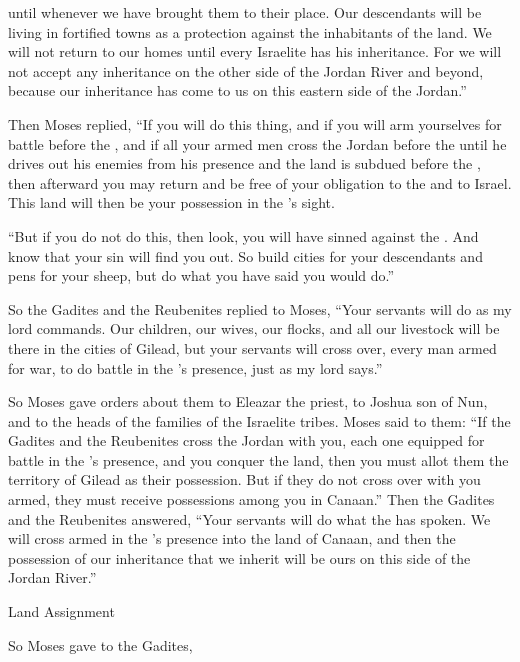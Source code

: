{until
whenever
we have
brought
them to
their place.
Our descendants
will be living
in fortified
towns
as a protection against the inhabitants
of the land.
We will not
return
to
our homes
until
every
Israelite
has his inheritance.
For
we will not
accept any inheritance
on the other side
of the Jordan River
and beyond,
because
our inheritance
has come
to us
on this eastern
side
of the Jordan.”
\par }{\PP {}Then Moses
replied, “If
you will do
this
thing,
and if
you will arm
yourselves for battle
before
the {},
and if all
your armed
men cross
the Jordan
before
the {}
until
he drives out
his enemies
from his presence
and the land
is subdued
before
the {}, then afterward
you may return
and be
free of your obligation
to the
{}
and to Israel.
This
land
will then be
your possession
in the
{}’s
sight.
\par }{\PP {}“But if
you do not
do
this,
then look,
you will have sinned
against the
{}. And know
that your sin
will find you out.
So build
cities
for your descendants
and pens
for your sheep,
but do what you have said
you would do.”
\par }{\PP {}So the Gadites
and the Reubenites
replied
to
Moses,
“Your servants
will do
as
my lord
commands.
Our children,
our wives,
our flocks,
and all
our livestock
will be
there
in the cities
of Gilead,
but your servants
will cross
over, every
man armed
for war,
to do battle
in the
{}’s
presence,
just
as my lord
says.”
\par }{\PP {}So Moses
gave orders
about them
to Eleazar
the priest,
to Joshua
son
of Nun,
and to the
heads
of the families
of the Israelite
tribes.
Moses
said
to
them: “If
the Gadites
and the Reubenites
cross
the
Jordan
with you,
each one equipped
for battle
in the
{}’s
presence,
and you conquer
the land,
then you
must
allot
them the territory
of Gilead
as their possession.
But if
they do not
cross
over with
you armed,
they must receive possessions
among
you in Canaan.”
Then
the Gadites
and the Reubenites
answered,
“Your servants
will do
what the
{}
has
spoken.
We
will cross
armed
in the
{}’s
presence
into the land
of Canaan,
and then
the possession
of our inheritance
that we inherit will be ours on this side
of the Jordan River.”
\par }{\SH Land Assignment
\par }{\PP {}So Moses
gave
to the Gadites,
}
